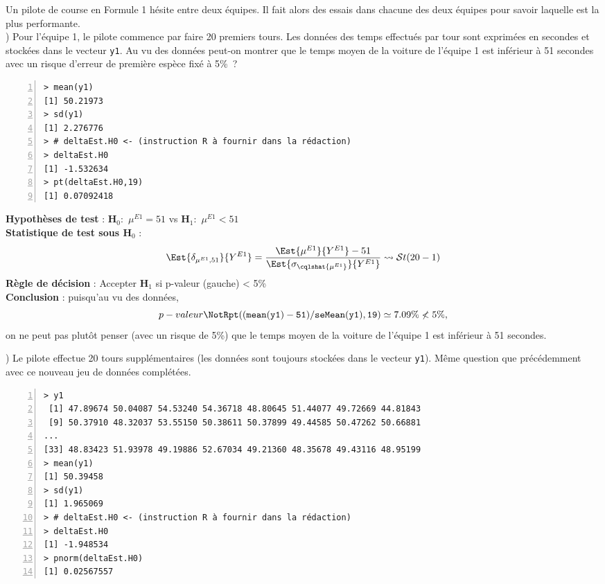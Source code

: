 \documentclass[10pt]{report}
\begin{document}
\begin{exercice}

Un pilote de course en Formule 1 hésite entre deux équipes. Il fait alors des essais dans chacune des deux équipes pour savoir laquelle est la plus performante.\\

) Pour l'équipe 1, le pilote commence par faire 20 premiers tours. Les données des temps effectués par tour sont exprimées en secondes et stockées dans le vecteur  \texttt{y1}. Au vu des données peut-on montrer que le temps moyen de la voiture de l'équipe 1 est inférieur à 51 secondes  avec un risque d'erreur de première espèce fixé à 5\%~?\\

\IndicR
\begin{Verbatim}[frame=leftline,fontfamily=tt,fontshape=n,numbers=left]
> mean(y1)
[1] 50.21973
> sd(y1)
[1] 2.276776
> # deltaEst.H0 <- (instruction R à fournir dans la rédaction)
> deltaEst.H0
[1] -1.532634
> pt(deltaEst.H0,19)
[1] 0.07092418
\end{Verbatim}


\begin{Correction}

\noindent \textbf{Hypothèses de test} : $\mathbf{H}_0:$ $\mu^{E1}=51$ vs {\large $\mathbf{H}_1:$ $\mu^{E1}<51$}\\
\textbf{Statistique de test sous $\mathbf{H}_0$} :
  $$
  \Est{\delta_{\mu^{E1},51}}{Y^{E1}}= {\displaystyle \frac{\Est{\mu^{E1}}{Y^{E1}}-51}{
\Est{\sigma_{\cqlshat{\mu^{E1}}}}{Y^{E1}}
}} 
  \leadsto \mathcal{S}t(20-1)
  $$
\textbf{Règle de décision} : Accepter $\mathbf{H}_1$ si 
  p-valeur (gauche) < 5\%\\
\noindent \textbf{Conclusion} :
puisqu'au vu des données, 
  \[
p-valeur\NotR\mathtt{pt((mean(y1)-51)/seMean(y1),19)} \simeq 7.09\%\nless5\%,
\]
on ne peut pas plutôt penser (avec un risque de 5\%) que le temps moyen de la voiture de l'équipe 1 est inférieur à 51 secondes.
\end{Correction}



) Le pilote effectue 20 tours supplémentaires (les données sont toujours stockées dans le vecteur \texttt{y1}).
Même question que précédemment avec ce nouveau jeu de données complétées.\\
\IndicR
\begin{Verbatim}[frame=leftline,fontfamily=tt,fontshape=n,numbers=left]
> y1
 [1] 47.89674 50.04087 54.53240 54.36718 48.80645 51.44077 49.72669 44.81843
 [9] 50.37910 48.32037 53.55150 50.38611 50.37899 49.44585 50.47262 50.66881
...
[33] 48.83423 51.93978 49.19886 52.67034 49.21360 48.35678 49.43116 48.95199
> mean(y1)
[1] 50.39458
> sd(y1)
[1] 1.965069
> # deltaEst.H0 <- (instruction R à fournir dans la rédaction)
> deltaEst.H0
[1] -1.948534
> pnorm(deltaEst.H0)
[1] 0.02567557
\end{Verbatim}




\end{exercice}
\end{document}
